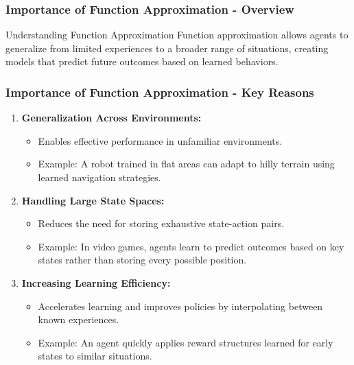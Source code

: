 \documentclass[aspectratio=169]{beamer}
\begin{document}
\begin{frame}[fragile]
    \frametitle{Importance of Function Approximation - Overview}
    \begin{block}{Understanding Function Approximation}
        Function approximation allows agents to generalize from limited experiences to a broader range of situations, creating models that predict future outcomes based on learned behaviors.
    \end{block}
\end{frame}

\begin{frame}[fragile]
    \frametitle{Importance of Function Approximation - Key Reasons}
    \begin{enumerate}
        \item \textbf{Generalization Across Environments:}
            \begin{itemize}
                \item Enables effective performance in unfamiliar environments.
                \item Example: A robot trained in flat areas can adapt to hilly terrain using learned navigation strategies.
            \end{itemize}

        \item \textbf{Handling Large State Spaces:}
            \begin{itemize}
                \item Reduces the need for storing exhaustive state-action pairs.
                \item Example: In video games, agents learn to predict outcomes based on key states rather than storing every possible position.
            \end{itemize}

        \item \textbf{Increasing Learning Efficiency:}
            \begin{itemize}
                \item Accelerates learning and improves policies by interpolating between known experiences.
                \item Example: An agent quickly applies reward structures learned for early states to similar situations.
            \end{itemize}
    \end{enumerate}
\end{frame}
\end{document}
